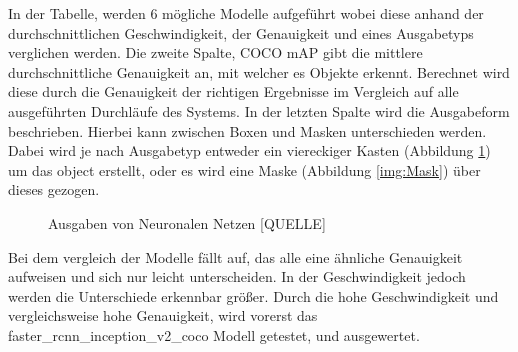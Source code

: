 \documentclass[a4paper,12pt,oneside]{article}
\begin{document}
In der Tabelle, werden 6 mögliche Modelle aufgeführt wobei diese anhand der durchschnittlichen Geschwindigkeit, der Genauigkeit und eines Ausgabetyps verglichen werden. Die zweite Spalte, COCO mAP gibt die mittlere durchschnittliche Genauigkeit an, mit welcher es Objekte erkennt. Berechnet wird diese durch die Genauigkeit der richtigen Ergebnisse im Vergleich auf alle ausgeführten Durchläufe des Systems. In der letzten Spalte wird die Ausgabeform beschrieben. Hierbei kann zwischen Boxen und Masken unterschieden werden. Dabei wird je nach Ausgabetyp entweder ein viereckiger Kasten (Abbildung \ref{img:Boxes}) um das object erstellt, oder es wird eine Maske (Abbildung \ref{img:Mask}) über dieses gezogen.

\begin{figure} 
	[h]
	\centering
    \label{img:Mask} 
    \label{img:Boxes} 
\caption{Ausgaben von Neuronalen Netzen [QUELLE]} 
\end{figure} 

\newpage

Bei dem vergleich der Modelle fällt auf, das alle eine ähnliche Genauigkeit aufweisen und sich nur leicht unterscheiden. In der Geschwindigkeit jedoch werden die Unterschiede erkennbar größer. Durch die hohe Geschwindigkeit und vergleichsweise hohe Genauigkeit, wird vorerst das faster\_rcnn\_inception\_v2\_coco Modell getestet, und ausgewertet.
\\
\end{document}
